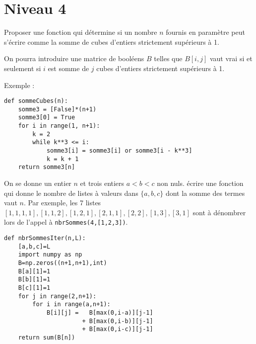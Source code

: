 \section{Niveau 4}
\begin{Exercise}
Proposer une fonction qui détermine si un nombre $n$ fournis en paramètre peut s'écrire comme la somme de cubes d'entiers strictement supérieurs à  1. 

On pourra introduire une matrice de booléens $B$ telles que $B[i,j]$ vaut vrai si et seulement si  $i$ est somme de $j$ cubes d'entiers strictement supérieurs à 1.

Exemple : 
\end{Exercise}
\begin{Answer}
\begin{lstlisting}
def sommeCubes(n):
    somme3 = [False]*(n+1)
    somme3[0] = True
    for i in range(1, n+1):
        k = 2
        while k**3 <= i:
            somme3[i] = somme3[i] or somme3[i - k**3]
            k = k + 1
    return somme3[n]
\end{lstlisting}
\newpage
\end{Answer}
\begin{Exercise}
On se donne un entier $n$ et trois entiers $a< b<c$ non nuls. écrire une fonction qui donne le nombre de listes à valeurs dans $\{a,b,c\}$ dont la somme des termes vaut $n$. Par exemple, les 7 listes $[1,1,1,1], [1,1,2],[1,2,1], [2,1,1], [2,2],[1,3],[3,1]$ sont à dénombrer lors de l'appel à {\tt nbrSommes(4,[1,2,3])}.
\end{Exercise}
\begin{Answer}
\begin{lstlisting}
def nbrSommesIter(n,L):
    [a,b,c]=L
    import numpy as np
    B=np.zeros((n+1,n+1),int)
    B[a][1]=1
    B[b][1]=1
    B[c][1]=1
    for j in range(2,n+1):
        for i in range(a,n+1):
            B[i][j] =   B[max(0,i-a)][j-1]
                      + B[max(0,i-b)][j-1]
                      + B[max(0,i-c)][j-1]
    return sum(B[n]) 
\end{lstlisting}
\end{Answer}
